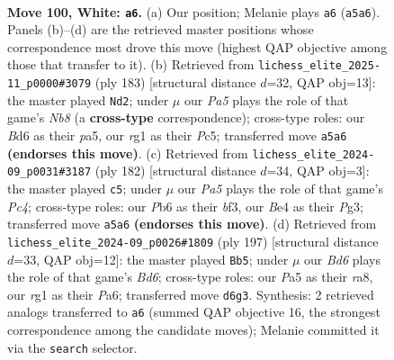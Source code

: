 \documentclass[11pt]{article}
\begin{document}
\clearpage

\begin{figure}[p]\centering
\begin{subfigure}{0.46\textwidth}\centering
\resizebox{\linewidth}{!}{%
\newchessgame
\chessboard[
  setfen={4k3/7R/1P1B4/P2N4/4B1b1/1K5p/8/6r1 w - - 5 100},
  showmover=false,
  pgfstyle=straightmove, color=movearrow, markmove={a5-a6}
]}
\caption{}
\end{subfigure}\hfill
\begin{subfigure}{0.46\textwidth}\centering
\resizebox{\linewidth}{!}{%
\newchessgame
\chessboard[
  setfen={8/2K3B1/p6R/Pbp5/8/8/4k3/1n6 b - - 62 92},
  showmover=false,
  pgfstyle=straightmove, color=movearrow, markmove={b1-d2}
]}
\caption{}
\end{subfigure}
\\[4pt]
\begin{subfigure}{0.46\textwidth}\centering
\resizebox{\linewidth}{!}{%
\newchessgame
\chessboard[
  setfen={5k2/2R5/4r3/7p/2P4B/3K1bP1/8/8 w - - 73 92},
  showmover=false,
  pgfstyle=straightmove, color=movearrow, markmove={c4-c5}
]}
\caption{}
\end{subfigure}\hfill
\begin{subfigure}{0.46\textwidth}\centering
\resizebox{\linewidth}{!}{%
\newchessgame
\chessboard[
  setfen={R7/8/p4b2/3k4/p5K1/2Pb4/1P6/4r3 b - - 5 99},
  showmover=false,
  pgfstyle=straightmove, color=movearrow, markmove={d3-b5}
]}
\caption{}
\end{subfigure}
\caption{\textbf{Move 100, White: \texttt{a6}.} (a) Our position; Melanie plays \texttt{a6} (\texttt{a5a6}). Panels (b)--(d) are the retrieved master positions whose correspondence most drove this move (highest QAP objective among those that transfer to it). (b) Retrieved from \texttt{lichess\_elite\_2025-11\_p0000\#3079} (ply 183) [structural distance $d$=32, QAP obj=13]: the master played \texttt{Nd2}; under $\mu$ our \emph{Pa5} plays the role of that game's \emph{Nb8} (a \textbf{cross-type} correspondence); cross-type roles: our \emph{B}d6 as their \emph{p}a5, our \emph{r}g1 as their \emph{P}c5; transferred move \texttt{a5a6} \textbf{(endorses this move)}. (c) Retrieved from \texttt{lichess\_elite\_2024-09\_p0031\#3187} (ply 182) [structural distance $d$=34, QAP obj=3]: the master played \texttt{c5}; under $\mu$ our \emph{Pa5} plays the role of that game's \emph{Pc4}; cross-type roles: our \emph{P}b6 as their \emph{b}f3, our \emph{B}e4 as their \emph{P}g3; transferred move \texttt{a5a6} \textbf{(endorses this move)}. (d) Retrieved from \texttt{lichess\_elite\_2024-09\_p0026\#1809} (ply 197) [structural distance $d$=33, QAP obj=12]: the master played \texttt{Bb5}; under $\mu$ our \emph{Bd6} plays the role of that game's \emph{Bd6}; cross-type roles: our \emph{P}a5 as their \emph{r}a8, our \emph{r}g1 as their \emph{P}a6; transferred move \texttt{d6g3}. Synthesis: 2 retrieved analogs transferred to \texttt{a6} (summed QAP objective 16, the strongest correspondence among the candidate moves); Melanie committed it via the \texttt{search} selector.}
\label{fig:thought-m198}
\end{figure}
\end{document}
